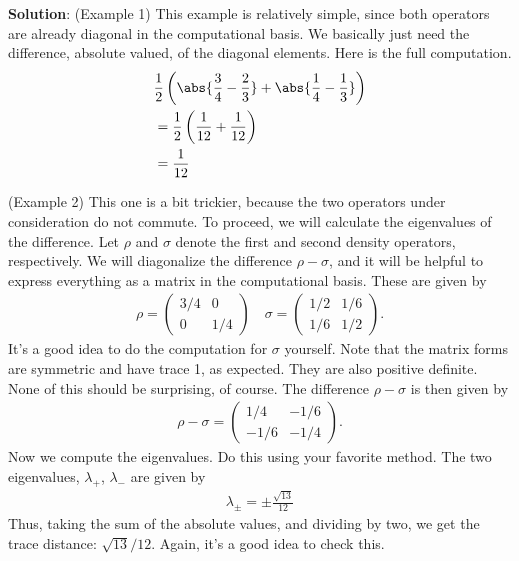 \documentclass{book}
\begin{document}
    \textbf{Solution}: (Example 1) This example is relatively simple, since both operators are already diagonal in the computational basis. We basically just need the difference, absolute valued, of the diagonal elements. Here is the full computation.
    \begin{align}
    \begin{aligned}
         &\frac{1}{2}\left(\abs{\frac{3}{4}-\frac{2}{3}}+\abs{\frac{1}{4}-\frac{1}{3}}\right) \\
         &= \frac{1}{2}\left(\frac{1}{12}+\frac{1}{12}\right) \\
         &= \frac{1}{12}
    \end{aligned}
    \end{align}
    
    (Example 2) This one is a bit trickier, because the two operators under consideration do not commute. To proceed, we will calculate the eigenvalues of the difference. Let $\rho$ and $\sigma$ denote the first and second density operators, respectively. We will diagonalize the difference $\rho-\sigma$, and it will be helpful to express everything as a matrix in the computational basis. These are given by
    \begin{align}
        \rho =
        \begin{pmatrix}
            3/4 & 0 \\
            0 & 1/4
        \end{pmatrix} \quad 
        \sigma = 
        \begin{pmatrix}
            1/2 & 1/6 \\
            1/6 & 1/2
        \end{pmatrix}.
    \end{align}
    It's a good idea to do the computation for $\sigma$ yourself. Note that the matrix forms are symmetric and have trace 1, as expected. They are also positive definite. None of this should be surprising, of course. The difference $\rho - \sigma$ is then given by 
    \begin{align}
        \rho-\sigma = 
        \begin{pmatrix}
            1/4 & -1/6 \\
            -1/6 & -1/4
        \end{pmatrix}.
    \end{align}
    Now we compute the eigenvalues. Do this using your favorite method. The two eigenvalues, $\lambda_+$, $\lambda_-$ are given by
    \begin{align}
        \lambda_\pm = \pm \frac{\sqrt{13}}{12}
    \end{align}
    Thus, taking the sum of the absolute values, and dividing by two, we get the trace distance: $\sqrt{13}/12$. Again, it's a good idea to check this. 
    
\end{document}
